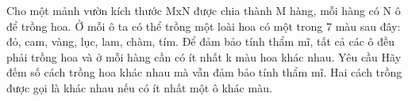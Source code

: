 Cho một mảnh vườn kích thước MxN được chia thành M hàng, mỗi hàng có N ô để trồng hoa. Ở mỗi ô ta có thể trồng một loài hoa có một trong 7 màu sau đây: đỏ, cam, vàng, lục, lam, chàm, tím. Để đảm bảo tính thẩm mĩ, tất cả các ô đều phải trồng hoa và ở mỗi hàng cần có ít nhất k màu hoa khác nhau.
   Yêu cầu  
Hãy đếm số cách trồng hoa khác nhau mà vẫn đảm bảo tính thẩm mĩ. Hai cách trồng được gọi là khác nhau nếu có ít nhất một ô khác màu.